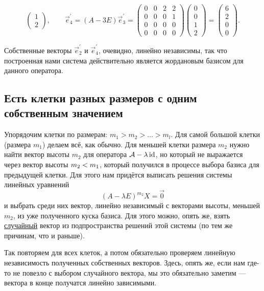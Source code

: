 \begin{solution}
\[\begin{pmatrix}
			1\\
			2
		\end{pmatrix},\qquad
		\vec{e}^\prime_4 = (A - 3E)\vec{e}^\prime_3 =
		\begin{pmatrix}
			0 & 0 & 2 & 2\\
			0 & 0 & 0 & 1\\
			0 & 0 & 0 & 0\\
			0 & 0 & 0 & 0
		\end{pmatrix}
		\begin{pmatrix}
			0\\
			0\\
			1\\
			2
		\end{pmatrix} =
		\begin{pmatrix}
			6\\
			2\\
			0\\
			0
		\end{pmatrix}.
	\]

	Собственные векторы $\vec{e}^\prime_2$ и $\vec{e}^\prime_4$, очевидно, линейно независимы, так что построенная нами система действительно является жордановым базисом для данного оператора.
\end{solution}

\subsection{Есть клетки разных размеров с одним собственным значением}

Упорядочим клетки по размерам: $m_1 > m_2 > \ldots > m_l$. Для самой большой клетки (размера $m_1$) делаем всё, как обычно. Для меньшей клетки размера $m_2$ нужно найти вектор высоты $m_2$ для оператора $\mathcal{A} - \lambda\operatorname{id}$, но который не выражается через вектор высоты $m_2 \hm< m_1$, который получился в процессе выбора базиса для предыдущей клетки. Для этого нам придётся выписать решения системы линейных уравнений
\[
	(A - \lambda E)^{m_2}X = \vec{0}
\]
и выбрать среди них вектор, линейно независимый с векторами высоты, меньшей $m_2$, из уже полученного куска базиса. Для этого можно, опять же, взять \underline{случайный} вектор из подпространства решений этой системы (по тем же причинам, что и раньше).

Так повторяем для всех клеток, а потом обязательно проверяем линейную независимость полученных собственных векторов. Здесь, опять же, если нам где-то не повезло с выбором случайного вектора, мы это обязательно заметим --- вектора в конце получатся линейно зависимыми.

